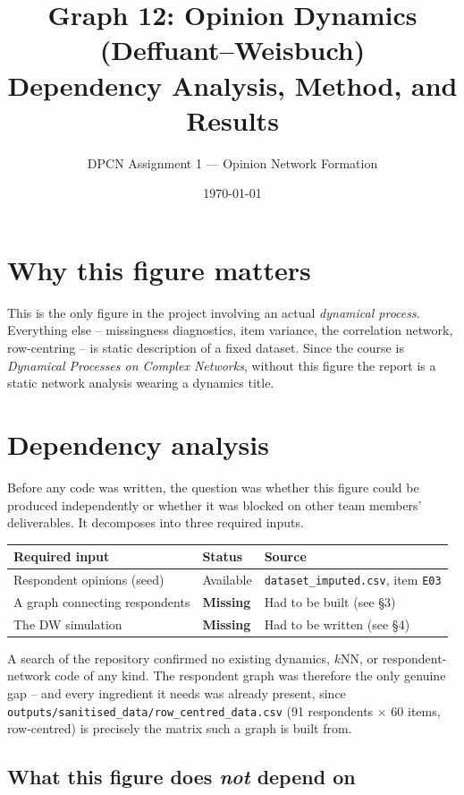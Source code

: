 \documentclass[11pt]{article}
\title{Graph 12: Opinion Dynamics (Deffuant--Weisbuch) \\
\large Dependency Analysis, Method, and Results}
\author{DPCN Assignment 1 --- Opinion Network Formation}
\date{\today}
\begin{document}
\maketitle
\sloppy

\section{Why this figure matters}

This is the only figure in the project involving an actual \emph{dynamical
process}. Everything else -- missingness diagnostics, item variance, the
correlation network, row-centring -- is static description of a fixed dataset.
Since the course is \emph{Dynamical Processes on Complex Networks}, without
this figure the report is a static network analysis wearing a dynamics title.

\section{Dependency analysis}

Before any code was written, the question was whether this figure could be
produced independently or whether it was blocked on other team members'
deliverables. It decomposes into three required inputs.

\begin{center}
\begin{tabularx}{\linewidth}{l l Y}
\toprule
Required input & Status & Source \\
\midrule
Respondent opinions (seed) & Available & \texttt{dataset\_imputed.csv}, item \texttt{E03} \\
A graph connecting respondents & \textbf{Missing} & Had to be built (see \S3) \\
The DW simulation & \textbf{Missing} & Had to be written (see \S4) \\
\bottomrule
\end{tabularx}
\end{center}

A search of the repository confirmed no existing dynamics, $k$NN, or
respondent-network code of any kind. The respondent graph was therefore the
only genuine gap -- and every ingredient it needs was already present, since
\texttt{outputs/sanitised\_data/row\_centred\_data.csv} (91 respondents $\times$
60 items, row-centred) is precisely the matrix such a graph is built from.

\subsection{What this figure does \emph{not} depend on}
\end{document}
